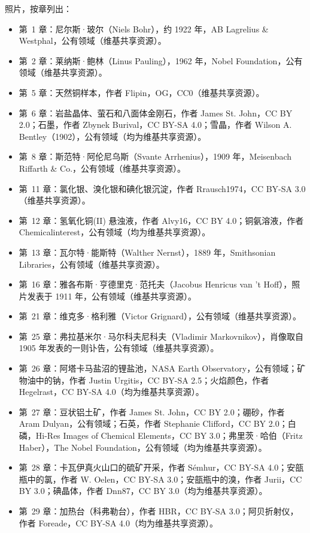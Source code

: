 \bigskip
\noindent 照片，按章列出：
\begin{itemize}\small
  \item 第~1 章：尼尔斯·玻尔（Niels Bohr），约 1922 年，AB Lagrelius \& Westphal，公有领域（维基共享资源）。
  \item 第~2 章：莱纳斯·鲍林（Linus Pauling），1962 年，Nobel Foundation，公有领域（维基共享资源）。
  \item 第~5 章：天然铜样本，作者 Flipin，OG，CC0（维基共享资源）。
  \item 第~6 章：岩盐晶体、萤石和八面体金刚石，作者 James St. John，CC BY 2.0；石墨，作者 Zbynek Burival，CC BY-SA 4.0；雪晶，作者 Wilson A. Bentley（1902），公有领域（均为维基共享资源）。
  \item 第~8 章：斯范特·阿伦尼乌斯（Svante Arrhenius），1909 年，Meisenbach Riffarth \& Co.，公有领域（维基共享资源）。
  \item 第~11 章：氯化银、溴化银和碘化银沉淀，作者 Rrausch1974，CC BY-SA 3.0（维基共享资源）。
  \item 第~12 章：氢氧化铜(II) 悬浊液，作者 Alvy16，CC BY 4.0；铜氨溶液，作者 Chemicalinterest，公有领域（均为维基共享资源）。
  \item 第~13 章：瓦尔特·能斯特（Walther Nernst），1889 年，Smithsonian Libraries，公有领域（维基共享资源）。
  \item 第~16 章：雅各布斯·亨德里克·范托夫（Jacobus Henricus van 't Hoff），照片发表于 1911 年，公有领域（维基共享资源）。
  \item 第~21 章：维克多·格利雅（Victor Grignard），公有领域（维基共享资源）。
  \item 第~25 章：弗拉基米尔·马尔科夫尼科夫（Vladimir Markovnikov），肖像取自 1905 年发表的一则讣告，公有领域（维基共享资源）。
  \item 第~26 章：阿塔卡马盐沼的锂盐池，NASA Earth Observatory，公有领域；矿物油中的钠，作者 Justin Urgitis，CC BY-SA 2.5；火焰颜色，作者 Hegelrast，CC BY-SA 4.0（均为维基共享资源）。
  \item 第~27 章：豆状铝土矿，作者 James St. John，CC BY 2.0；硼砂，作者 Aram Dulyan，公有领域；石英，作者 Stephanie Clifford，CC BY 2.0；白磷，Hi-Res Images of Chemical Elements，CC BY 3.0；弗里茨·哈伯（Fritz Haber），The Nobel Foundation，公有领域（均为维基共享资源）。
  \item 第~28 章：卡瓦伊真火山口的硫矿开采，作者 S\'emhur，CC BY-SA 4.0；安瓿瓶中的氯，作者 W. Oelen，CC BY-SA 3.0；安瓿瓶中的溴，作者 Jurii，CC BY 3.0；碘晶体，作者 Dnn87，CC BY 3.0（均为维基共享资源）。
  \item 第~29 章：加热台（科弗勒台），作者 HBR，CC BY-SA 3.0；阿贝折射仪，作者 Foreade，CC BY-SA 4.0（均为维基共享资源）。
\end{itemize}
\clearpage
